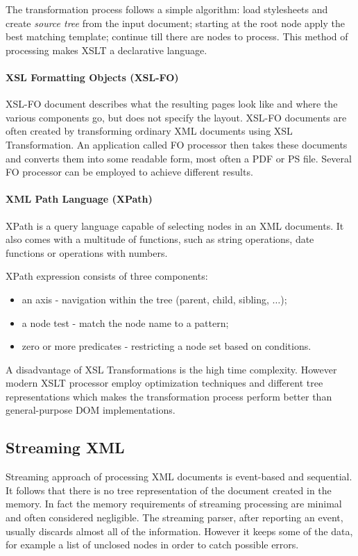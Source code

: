 \documentclass[11pt,oneside,final]{fithesis2}
\begin{document}
The transformation process follows a simple algorithm: load stylesheets and create \textit{source tree} from the input document; starting at the root node apply the best matching template; continue till there are nodes to process. This method of processing makes XSLT a declarative language.

\paragraph*{XSL Formatting Objects (XSL-FO)}
\label{xsl:xsl-fo}
XSL-FO document describes what the resulting pages look like and where the various components go, but does not specify the layout. XSL-FO documents are often created by transforming ordinary XML documents using XSL Transformation. An application called FO processor then takes these documents and converts them into some readable form, most often a PDF or PS file. Several FO processor can be employed to achieve different results.

\paragraph*{XML Path Language (XPath)}
\label{xsl:xpath}
XPath is a query language capable of selecting nodes in an XML documents. It also comes with a multitude of functions, such as string operations, date functions or operations with numbers. 

XPath expression consists of three components: 
\begin{itemize}
\item an axis - navigation within the tree (parent, child, sibling, $\ldots$);
\item a node test - match the node name to a pattern;
\item zero or more predicates - restricting a node set based on conditions.
\end{itemize}

A disadvantage of XSL Transformations is the high time complexity. However modern XSLT processor employ optimization techniques and different tree representations which makes the transformation process perform better than general-purpose DOM implementations.

\subsection{Streaming XML}
Streaming approach of processing XML documents is event-based and sequential. It follows that there is no tree representation of the document created in the memory. In fact the memory requirements of streaming processing are minimal and often considered negligible. The streaming parser, after reporting an event, usually discards almost all of the information. However it keeps some of the data, for example a list of unclosed nodes in order to catch possible errors. 
\end{document}
